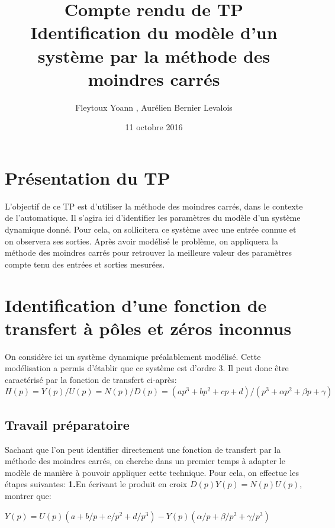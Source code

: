 \documentclass[12pt]{article}
\title{Compte rendu de TP\\ \textbf{Identification du modèle d'un système par la méthode des moindres carrés}}
\author{Fleytoux Yoann , Aurélien Bernier Levalois}
\date{11 octobre 2016}
\begin{document}
\maketitle


\tableofcontents
\vspace{0.6cm}


\section{Présentation du TP}

L'objectif de ce TP est d'utiliser la méthode des moindres carrés, dans le contexte de l'automatique. Il s'agira ici d'identifier les paramètres du modèle d'un système dynamique donné. Pour cela, on sollicitera ce système avec une entrée connue et on observera ses sorties. Après avoir modélisé le problème, on appliquera la méthode des moindres carrés pour retrouver la meilleure valeur des paramètres compte tenu des entrées et sorties mesurées.


\section{Identification d'une fonction de transfert à pôles et zéros inconnus}
On considère ici un système dynamique préalablement modélisé. Cette modélisation a permis d'établir que ce système est d'ordre 3. Il peut donc être caractérisé par la fonction de transfert ci-après:
\smallbreak
\begin{math}
H(p)=Y(p)/U(p)=N(p)/D(p)=(ap^3+bp^2+cp+d)/(p^3+\alpha p^2+\beta p + \gamma)
\end{math}
 
\subsection{Travail préparatoire}
Sachant que l'on peut identifier directement une fonction de transfert par la méthode des moindres carrés, on cherche dans un premier temps à adapter le modèle de manière à pouvoir appliquer cette technique. Pour cela, on effectue les étapes suivantes:\smallbreak
\medbreak
\textbf{1.}En écrivant le produit en croix $D(p)Y(p)=N(p)U(p)$, montrer que:\smallbreak

\begin{math}
Y(p)=U(p)(a+b/p+c/p^2+d/p^3)-Y(p)(\alpha /p +\beta /p^2 + \gamma /p^3)
\end{math}
\end{document}
